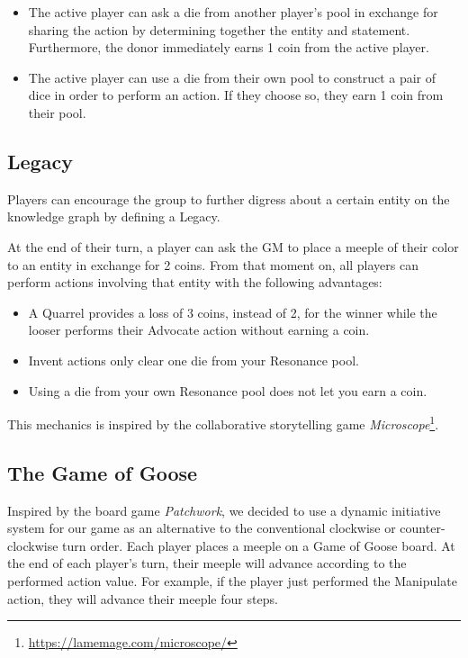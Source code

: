\documentclass{article}
\begin{document}
\begin{multicols}{2}
\begin{itemize}
\item The active player can ask a die from another player's pool in exchange for sharing the action by determining together the entity and statement. Furthermore, the donor immediately earns 1 coin from the active player.
\item The active player can use a die from their own pool to construct a pair of dice in order to perform an action. If they choose so, they earn 1 coin from their pool.  
\end{itemize}

\subsection{Legacy}

Players can encourage the group to further digress about a certain entity on the knowledge graph by defining a Legacy. 

At the end of their turn, a player can ask the GM to place a meeple of their color to an entity in exchange for 2 coins. From that moment on, all players can perform actions involving that entity with the following advantages:

\begin{itemize}
\item A Quarrel provides a loss of 3 coins, instead of 2, for the winner while the looser performs their Advocate action without earning a coin.
\item  Invent actions only clear one die from your Resonance pool.
\item Using a die from your own Resonance pool does not let you earn a coin.
\end{itemize}


This mechanics is inspired by the collaborative storytelling game \textit{Microscope}\footnote{\url{https://lamemage.com/microscope/}}. 

\subsection{The Game of Goose}

Inspired by the board game \textit{Patchwork}, we decided to use a dynamic initiative system for our game as an alternative to the conventional clockwise or counter-clockwise turn order. Each player places a meeple on a Game of Goose board. At the end of each player's turn, their meeple will advance according to the performed action value. For example, if the player just performed the Manipulate action, they will advance their meeple four steps.


\end{multicols}
\end{document}
